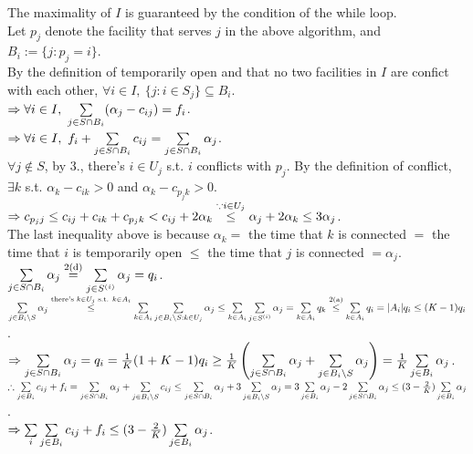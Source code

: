 \begin{pr}
\begin{enumerate}
\end{enumerate}
The maximality of $I$ is guaranteed by the condition of the while loop.\\
Let $p_j$ denote the facility that serves $j$ in the above algorithm, and $B_i:=\{j:p_j=i\}$.\\
By the definition of temporarily open and that no two facilities in $I$ are confict with each other, $\forall i\in I,\ \{j:i\in S_j\}\subseteq B_i$.\\
$\Rightarrow\forall i\in I,\ \sum\limits_{j\in S\cap B_i}(\alpha_j-c_{ij})=f_i$.\\
$\Rightarrow\forall i\in I,\ f_i+\sum\limits_{j\in S\cap B_i}c_{ij}=\sum\limits_{j\in S\cap B_i}\alpha_j$.\\
$\forall j\notin S$, by 3., there's $i\in U_j$ s.t. $i$ conflicts with $p_j$. By the definition of conflict, $\exists k$ s.t. $\alpha_k-c_{ik}>0$ and $\alpha_k-c_{p_jk}>0$.\\
$\Rightarrow c_{p_jj}\leq c_{ij}+c_{ik}+c_{p_jk}<c_{ij}+2\alpha_k\overset{\because i\in U_j}\leq\alpha_j+2\alpha_k\leq3\alpha_j$.\\
The last inequality above is because $\alpha_k=$ the time that $k$ is connected $=$ the time that $i$ is temporarily open $\leq$ the time that $j$ is connected $=\alpha_j$.\\
$\sum\limits_{j\in S\cap B_i}\alpha_j\overset{\text{2(d)}}=\sum\limits_{j\in S^{(i)}}\alpha_j=q_i$.\\
$\sum\limits_{j\in B_i\setminus S}\alpha_j\overset{\text{there's }k\in U_j\text{ s.t. }k\in A_i}\leq\sum\limits_{k\in A_i}\sum\limits_{j\in B_i\setminus S:k\in U_j}\alpha_j\leq\sum\limits_{k\in A_i}\sum\limits_{j\in S^{(i)}}\alpha_j=\sum\limits_{k\in A_i}q_k\overset{\text{2(a)}}\leq\sum\limits_{k\in A_i}q_i=|A_i|q_i\leq(K-1)q_i$.\\
$\Rightarrow\sum\limits_{j\in S\cap B_i}\alpha_j=q_i=\frac1K(1+K-1)q_i\geq\frac1K\left(\sum\limits_{j\in S\cap B_i}\alpha_j+\sum\limits_{j\in B_i\setminus S}\alpha_j\right)=\frac1K\sum\limits_{j\in B_i}\alpha_j$.\\
$\therefore\sum\limits_{j\in B_i}c_{ij}+f_i=\sum\limits_{j\in S\cap B_i}\alpha_j+\sum\limits_{j\in B_i\setminus S}c_{ij}\leq\sum\limits_{j\in S\cap B_i}\alpha_j+3\sum\limits_{j\in B_i\setminus S}\alpha_j=3\sum\limits_{j\in B_i}\alpha_j-2\sum\limits_{j\in S\cap B_i}\alpha_j\leq(3-\frac2K)\sum\limits_{j\in B_i}\alpha_j$.\\
$\Rightarrow\sum\limits_i\sum\limits_{j\in B_i}c_{ij}+f_i\leq(3-\frac2K)\sum\limits_{j\in B_i}\alpha_j$.
\end{pr}
